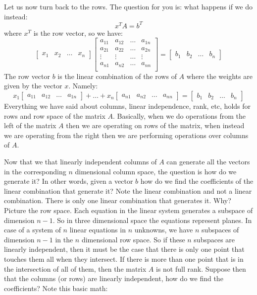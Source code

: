 \documentclass[computationalMathematics.tex]{subfiles}
\begin{document}
\par Let us now turn back to the rows. The question for you is: what happens if we do instead:
\[
    x^T A = b^T
\]
where $x^T$ is the row vector, so we have:
\[
    \begin{bmatrix}
        x_1 & x_2 & \dots & x_n
    \end{bmatrix}
    \begin{bmatrix}
        a_{11} & a_{12} & \dots & a_{1n} \\
        a_{21} & a_{22} & \dots & a_{2n} \\
        \vdots & \vdots & \dots & \vdots \\
        a_{n1} & a_{n2} & \dots & a_{nn} \\
    \end{bmatrix}
    = 
    \begin{bmatrix}
        b_1 & b_2 & \dots & b_n
    \end{bmatrix}
\]
The row vector $b$ is the linear combination of the rows of $A$ where the weights are given by the vector $x$. Namely:
\[
    x_1
    \begin{bmatrix}
        a_{11} & a_{12} & \dots & a_{1n}
    \end{bmatrix}
    +
    \dots
    +
    x_n
    \begin{bmatrix}
        a_{n1} & a_{n2} & \dots & a_{nn}
    \end{bmatrix}
    =
    \begin{bmatrix}
        b_1 & b_2 & \dots & b_n
    \end{bmatrix}
\]
Everything we have said about columns, linear independence, rank, etc, holds for rows and row space of the matrix $A$. Basically, when we do operations from the left of the matrix $A$ then we are operating on rows of the matrix, when instead we are operating from the right then we are performing operations over columns of $A$.
\par Now that we that linearly independent columns of $A$ can generate all the vectors in the corresponding $n$ dimensional column space, the question is how do we generate it? In other words, given a vector $b$ how do we find the coefficients of the linear combination that generate it? Note the linear combination and not a linear combination. There is only one linear combination that generates it. Why? Picture the row space. Each equation in the linear system generates a subspace of dimension $n-1$. So in three dimensional space the equations represent planes. In case of a system of $n$ linear equations in $n$ unknowns, we have $n$ subspaces of dimension $n-1$ in the $n$ dimensional row space. So if these $n$ subspaces are linearly independent, then it must be the case that there is only one point that touches them all when they intersect. If there is more than one point that is in the intersection of all of them, then the matrix $A$ is not full rank. Suppose then that the columns (or rows) are linearly independent, how do we find the coefficients? Note this basic math:
\end{document}
